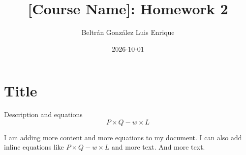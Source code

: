 \documentclass[
  letterpaper,
  DIV=11,
  numbers=noendperiod]{scrartcl}
\title{{[}Course Name{]}: Homework 2}
\author{Beltrán González Luis Enrique}
\date{2026-10-01}
\begin{document}
\maketitle


\section{Title}\label{title}

Description and equations \[
P \times Q-w \times L
\]

I am adding more content and more equations to my document. I can also
add inline equations like \(P \times Q-w \times L\) and more text. And
more text.
\end{document}
